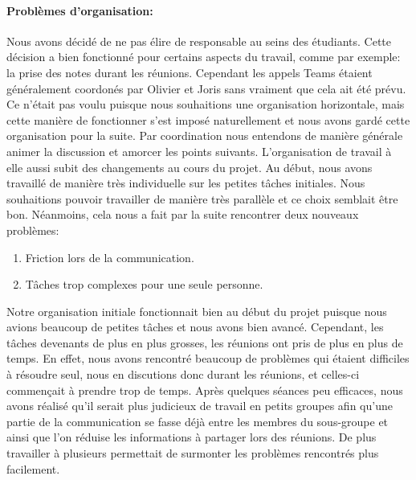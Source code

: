 \paragraph{Problèmes d'organisation:} Nous avons décidé de ne pas élire de responsable au seins des étudiants. Cette décision a bien fonctionné pour certains aspects du travail, comme par exemple: la prise des notes durant les réunions.
Cependant les appels Teams étaient généralement coordonés par Olivier et Joris sans vraiment que cela ait été prévu. Ce n'était pas voulu puisque nous souhaitions une organisation horizontale, mais cette manière de fonctionner s'est imposé naturellement et nous avons gardé cette organisation pour la suite. Par coordination nous entendons de manière générale animer la discussion et amorcer les points suivants. 
L'organisation de travail à elle aussi subit des changements au cours du projet. Au début, nous avons travaillé de manière très individuelle sur les petites tâches initiales. Nous souhaitions pouvoir travailler de manière très parallèle et ce choix semblait être bon.
Néanmoins, cela nous a fait par la suite rencontrer deux nouveaux problèmes:
\begin{enumerate}
    \item Friction lors de la communication. \label{item:friction}
    \item Tâches trop complexes pour une seule personne. \label{item:complex}
\end{enumerate}
Notre organisation initiale fonctionnait bien au début du projet puisque nous avions beaucoup de petites tâches et nous avons bien avancé. 
Cependant, les tâches devenants de plus en plus grosses, les réunions ont pris de plus en plus de temps. 
En effet, nous avons rencontré beaucoup de problèmes qui étaient difficiles à résoudre seul, nous en discutions donc durant les réunions, et celles-ci commençait à prendre trop de temps.
Après quelques séances peu efficaces, nous avons réalisé qu'il serait plus judicieux de travail en petits groupes afin qu'une partie de la communication se fasse déjà entre les membres du sous-groupe et ainsi que l'on réduise les informations à partager lors des réunions. De plus travailler à plusieurs permettait de surmonter les problèmes rencontrés plus facilement.
\paragraph{}

